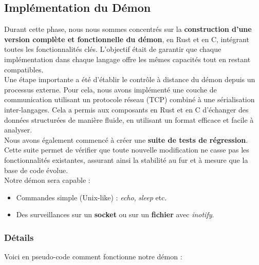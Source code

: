 \documentclass{article}
\begin{document}
\subsection{Implémentation du Démon}


Durant cette phase, nous nous sommes concentrés sur la \textbf{construction d’une version complète et fonctionnelle du démon}, en Rust et en C, intégrant toutes les fonctionnalités clés. L’objectif était de garantir que chaque implémentation dans chaque langage offre les mêmes capacités tout en restant compatibles.\\

Une étape importante a été d’établir le contrôle à distance du démon depuis un processus externe. Pour cela, nous avons implémenté une couche de communication utilisant un protocole réseau (TCP) combiné à une sérialisation inter-langages. Cela a permis aux composants en Rust et en C d’échanger des données structurées de manière fluide, en utilisant un format efficace et facile à analyser.\\

Nous avons également commencé à créer une \textbf{suite de tests de régression}. Cette suite permet de vérifier que toute nouvelle modification ne casse pas les fonctionnalités existantes, assurant ainsi la stabilité au fur et à mesure que la base de code évolue.\\

Notre démon sera capable : 
\begin{itemize}
    \item Commandes simple (Unix-like) : \textit{echo}, \textit{sleep} etc.
    \item Des surveillances sur un \textbf{socket} ou sur un \textbf{fichier} avec \textit{inotify}.
\end{itemize}


\subsubsection{Détails}

Voici en pseudo-code comment fonctionne notre démon :
\end{document}

